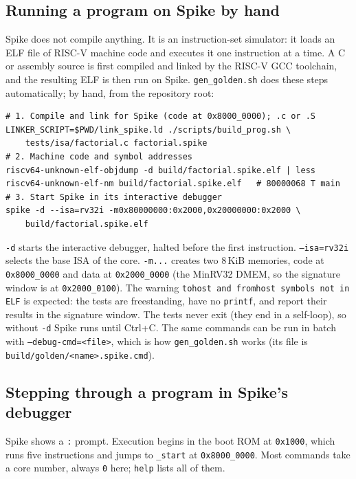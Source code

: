 \subsection{Running a program on Spike by hand}
\label{sec:spike-manual}
Spike does not compile anything. It is an instruction-set simulator: it loads an
ELF file of RISC-V machine code and executes it one instruction at a time. A C or
assembly source is first compiled and linked by the RISC-V GCC toolchain, and the
resulting ELF is then run on Spike. \texttt{gen\_golden.sh} does these steps
automatically; by hand, from the repository root:
\begin{lstlisting}[style=minrv]
# 1. Compile and link for Spike (code at 0x8000_0000); .c or .S
LINKER_SCRIPT=$PWD/link_spike.ld ./scripts/build_prog.sh \
    tests/isa/factorial.c factorial.spike
# 2. Machine code and symbol addresses
riscv64-unknown-elf-objdump -d build/factorial.spike.elf | less
riscv64-unknown-elf-nm build/factorial.spike.elf   # 80000068 T main
# 3. Start Spike in its interactive debugger
spike -d --isa=rv32i -m0x80000000:0x2000,0x20000000:0x2000 \
    build/factorial.spike.elf
\end{lstlisting}
\texttt{-d} starts the interactive debugger, halted before the first
instruction. \texttt{--isa=rv32i} selects the base ISA of the core.
\texttt{-m...} creates two 8\,KiB memories, code at \texttt{0x8000\_0000} and
data at \texttt{0x2000\_0000} (the MinRV32 DMEM, so the signature window is at
\texttt{0x2000\_0100}). The warning \texttt{tohost and fromhost symbols not in
ELF} is expected: the tests are freestanding, have no \texttt{printf}, and report
their results in the signature window. The tests never exit (they end in a
self-loop), so without \texttt{-d} Spike runs until Ctrl+C. The same commands can
be run in batch with \texttt{--debug-cmd=<file>}, which is how
\texttt{gen\_golden.sh} works (its file is
\texttt{build/golden/<name>.spike.cmd}).

\subsection{Stepping through a program in Spike's debugger}
\label{sec:spike-debug}
Spike shows a \texttt{:} prompt. Execution begins in the boot ROM at
\texttt{0x1000}, which runs five instructions and jumps to \texttt{\_start} at
\texttt{0x8000\_0000}. Most commands take a core number, always \texttt{0} here;
\texttt{help} lists all of them.

